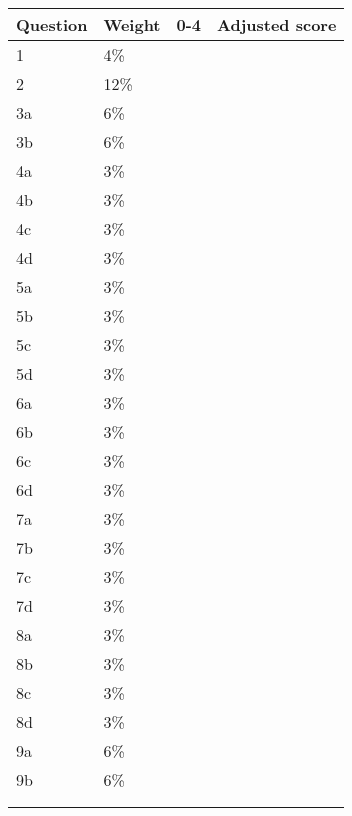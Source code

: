 \documentclass[a4paper,12pt]{book}
\begin{document}
    \begin{center}
        
        \begin{tabular}{ | l | l | l | l | }
            \hline
            \textbf{ Question } & \textbf{ Weight } & \textbf{ 0-4 } & \textbf{ Adjusted score }
            \\ \hline{}
            
            1 & 4\% & &    \\ \hline
            2 & 12\% & &    \\ \hline
            3a & 6\% & &    \\ \hline
            3b & 6\% & &    \\ \hline
            4a & 3\% & &    \\ \hline
            4b & 3\% & &    \\ \hline
            4c & 3\% & &    \\ \hline
            4d & 3\% & &    \\ \hline
            5a & 3\% & &    \\ \hline
            5b & 3\% & &    \\ \hline
            5c & 3\% & &    \\ \hline
            5d & 3\% & &    \\ \hline
            6a & 3\% & &    \\ \hline
            6b & 3\% & &    \\ \hline
            6c & 3\% & &    \\ \hline
            6d & 3\% & &    \\ \hline
            7a & 3\% & &    \\ \hline
            7b & 3\% & &    \\ \hline
            7c & 3\% & &    \\ \hline
            7d & 3\% & &    \\ \hline
            8a & 3\% & &    \\ \hline
            8b & 3\% & &    \\ \hline
            8c & 3\% & &    \\ \hline
            8d & 3\% & &    \\ \hline
            9a & 6\% & &    \\ \hline
            9b & 6\% & &    \\ \hline
            & & & \\ \hline
            & & & \\ \hline
            
            
        \end{tabular}
    \end{center}
    
\end{document}
